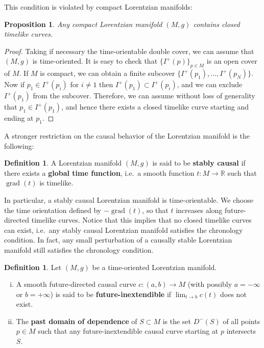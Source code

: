 \documentclass[10pt]{amsart}
\newcommand{\bbR}{\mathbb{R}}      %
\newcommand{\grad}{\operatorname{grad}}
\newtheorem{Prop}[Thm]{Proposition}
\theoremstyle{definition}
\newtheorem{Def}[Thm]{Definition}
\theoremstyle{remark}
\begin{document}
This condition is violated by compact Lorentzian manifolds:

\begin{Prop}
Any compact Lorentzian manifold $(M,g)$ contains closed timelike curves.
\end{Prop}

\begin{proof}
Taking if necessary the time-orientable double cover, we can assume that $(M,g)$ is time-oriented. It is easy to check that $\{ I^+(p) \}_{p \in M}$ is an open cover of $M$. If $M$ is compact, we can obtain a finite subcover $\{ I^+(p_1), \ldots, I^+(p_N) \}$. Now if $p_1 \in I^+(p_i)$ for $i \neq 1$ then $I^+(p_1) \subset I^+(p_i)$, and we can exclude $I^+(p_1)$ from the subcover. Therefore, we can assume without loss of generality that $p_1 \in I^+(p_1)$, and hence there exists a closed timelike curve starting and ending at $p_1$.
\end{proof}

A stronger restriction on the causal behavior of the Lorentzian manifold is the following:

\begin{Def}
A Lorentzian manifold $(M,g)$ is said to be {\bf stably causal} if there exists a {\bf global time function}, i.e.~a smooth function $t:M \to \bbR$ such that $\grad(t)$ is timelike.
\end{Def}

In particular, a stably causal Lorentzian manifold is time-orientable. We choose the time orientation defined by $-\grad(t)$, so that $t$ increases along future-directed timelike curves. Notice that this implies that no closed timelike curves can exist, i.e.~any stably causal Lorentzian manifold satisfies the chronology condition. In fact, any small perturbation of a causally stable Lorentzian manifold still satisfies the chronology condition.

\begin{Def}
Let $(M,g)$ be a time-oriented Lorentzian manifold. 
\begin{enumerate}[(i)]
\item
A smooth future-directed causal curve $c:(a,b) \to M$ (with possibly $a=-\infty$ or $b=+\infty$) is said to be {\bf future-inextendible} if $\lim_{t \to b} c(t)$ does not exist.
\item
The {\bf past domain of dependence} of $S\subset M$ is the set $D^-(S)$ of all points $p \in M$ such that any future-inextendible causal curve starting at $p$ intersects $S$.
\end{enumerate}
\end{Def}
\end{document}

